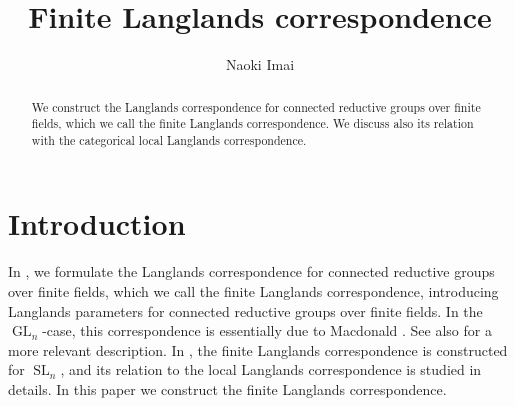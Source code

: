 \documentclass[12pt,a4paper]{article}
\DeclareMathOperator{\SL}{SL}
\DeclareMathOperator{\GL}{GL}
\begin{document}
\title{Finite Langlands correspondence}
\author{Naoki Imai} 

\date{}

\maketitle


\begin{abstract}
We construct the Langlands correspondence for connected reductive groups over finite fields, which we call the finite Langlands correspondence. We discuss also its relation with the categorical local Langlands correspondence. 
\end{abstract}



\section{Introduction}\label{sec:intro}

In \cite{IVLpfin}, we formulate 
the Langlands correspondence for connected reductive groups over finite fields, which we call the finite Langlands correspondence, introducing Langlands parameters for connected reductive groups over finite fields. 
In the $\GL_n$-case, this correspondence is essentially due to Macdonald \cite{MacZetafingen}. See also \cite{AubMaccor} for a more relevant description. 
In \cite{ColRedffSL}, the finite Langlands correspondence is constructed for $\SL_n$, and its relation to the local Langlands correspondence is studied in details. 
In this paper we construct the finite Langlands correspondence.
\end{document}
